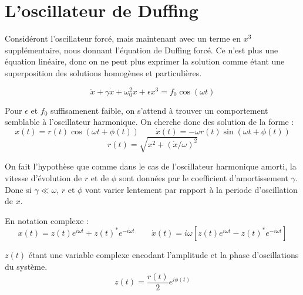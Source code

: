\chapter{L'oscillateur de Duffing}

Considéront l'oscillateur forcé, mais maintenant avec un terme en $x^3$ supplémentaire, nous donnant l'équation de Duffing forcé. Ce n'est plus une équation linéaire, donc on ne peut plus exprimer la solution comme étant une superposition des solutions homogènes et particulières.


\begin{equation}
    \ddot{x} + \gamma \dot{x} + \omega_0^2 x + \epsilon x^3 = f_0 \cos(\omega t)
    \label{eq:duffing}
\end{equation}


Pour $\epsilon$ et $f_0$ suffisamenent faible, on s'attend à trouver un comportement semblable à l'oscillateur harmonique. 
On cherche donc des solution de la forme :
\begin{equation}
x(t) = r(t)\cos(\omega t + \phi(t)) \qquad \dot{x}(t) =  -\omega r(t)\sin(\omega t + \phi(t))
\label{eq:duff_x_xdot}
\end{equation}
\begin{equation*}
    r(t) = \sqrt{x^2 + (\dot{x}/\omega)^2}
\end{equation*}


On fait l'hypothèse que comme dans le cas de l'oscillateur harmonique amorti, 
la vitesse d'évolution de $r$ et de $\phi$ sont données par le coefficient d'amortissement $\gamma$. 
Donc si $\gamma \ll \omega$,  $r$ et $\phi$ vont varier
 lentement par rapport à la periode d'oscillation de $x$.

En notation complexe :
\begin{equation}
    x(t) = z(t)e^{i\omega t} + z(t)^* e^{-i\omega t}
    \qquad 
    \dot{x}(t) = i\omega \left[ z(t)e^{i\omega t} - z(t)^* e^{-i\omega t} \right]
\end{equation}


$z(t)$ étant une variable complexe encodant l'amplitude et la phase d'oscillations du système.
\[ z(t) = \frac{r(t)}{2}e^{i\phi(t)} \]

